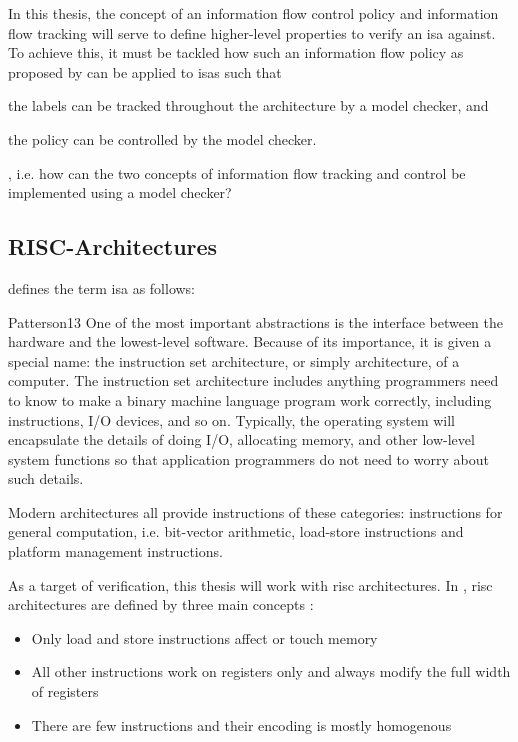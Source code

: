 In this thesis, the concept of an information flow control policy and information flow tracking will serve to define higher-level properties to verify an \gls{isa} against.
To achieve this, it must be tackled how such an information flow policy as proposed by \citeauthor{Ferraiuolo17} can be applied to \glspl{isa} such that \begin{enumerate*}[label=\alph*)]
    \item the labels can be tracked throughout the architecture by a model checker, and
    \item the policy can be controlled by the model checker.
\end{enumerate*}, i.e. how can the two concepts of information flow tracking and control be implemented using a model checker?

\subsection{RISC-Architectures}
\label{sec:riscs}

 defines the term \gls{isa} as follows:
\begin{displaycquote}[p.22]{Patterson13}
    One of the most important abstractions  is the interface between the hardware and the lowest-level software.
    Because of its importance, it is given a special name: the instruction set architecture, or simply architecture, of a computer.
    The instruction set architecture includes anything programmers need to know to make a binary machine language program work correctly, including instructions, I/O devices, and so on.
    Typically, the operating system will encapsulate the details of doing I/O, allocating memory, and other low-level system functions so that application programmers do not need to worry about such details.
\end{displaycquote}

Modern architectures all provide instructions of these categories: instructions for general computation, i.e. bit-vector arithmetic, load-store instructions and platform management instructions.

As a target of verification, this thesis will work with \gls{risc} architectures.
In , \gls{risc} architectures are defined by three main concepts \cite[p.C-4]{Hennessy12}:
\begin{itemize}
    \item Only load and store instructions affect or touch memory
    \item All other instructions work on registers only and always modify the full width of registers
    \item There are few instructions and their encoding is mostly homogenous
\end{itemize}

